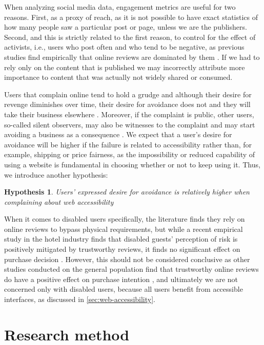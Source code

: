 \documentclass[12pt, a4paper]{article}
\newtheorem{hyp}{Hypothesis}
\begin{document}
When analyzing social media data, engagement metrics are useful for two reasons. First,
as a proxy of reach, as it is not possible to have exact statistics of how many people
saw a particular post or page, unless we are the publishers. Second, and this is
strictly related to the first reason, to control for the effect of activists, i.e.,
users who post often and who tend to be negative, as previous studies find empirically
that online reviews are dominated by them \cite{moe2012}. If we had to rely only on the
content that is published we may incorrectly attribute more importance to content that
was actually not widely shared or consumed.

Users that complain online tend to hold a grudge and although their desire for revenge
diminishes over time, their desire for avoidance does not and they will take their
business elsewhere \cite{tripp2011unhappy}. Moreover, if the complaint is public, other
users, so-called silent observers, may also be witnesses to the complaint and may start
avoiding a business as a consequence \cite{lopez2021}. We expect that a user's desire
for avoidance will be higher if the failure is related to accessibility rather than,
for example, shipping or price fairness, as the impossibility or reduced capability of
using a website is fundamental in choosing whether or not to keep using it. Thus, we
introduce another hypothesis:

\begin{hyp}
  Users' expressed desire for avoidance is relatively higher when complaining about web
  accessibility
\end{hyp}

When it comes to disabled users specifically, the literature finds they rely on online
reviews to bypass physical requirements, but while a recent empirical study in the
hotel industry finds that disabled guests' perception of risk is positively mitigated
by trustworthy reviews, it finds no significant effect on purchase decision
\cite{williams2006, zhang2021}. However, this should not be considered conclusive as
other studies conducted on the general population find that trustworthy online reviews
do have a positive effect on purchase intention \cite{chevalier2006, chakraborty2019,
  ventre2020}, and ultimately we are not concerned only with disabled users, because all
users benefit from accessible interfaces, as discussed in
\autoref{sec:web-accessibility}.

\section{Research method}
\end{document}
